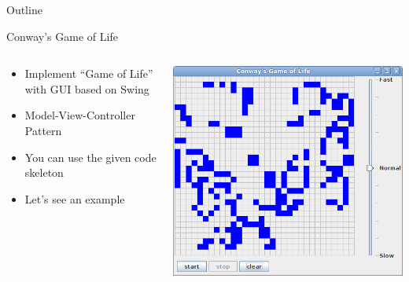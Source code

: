 \begin{frame}{Outline}
  \tableofcontents[current]
\end{frame}

\begin{frame}{Conway's Game of Life}
  \begin{columns}[c]
    \begin{column}{0.45\textwidth}
      \begin{itemize}
      \item Implement ``Game of Life'' with GUI based on Swing
      \item Model-View-Controller Pattern
      \item You can use the given code skeleton
      \item Let's see an example
      \end{itemize}
    \end{column}
    \begin{column}{0.55\textwidth}
      \begin{center}
        \includegraphics[width=\textwidth]{figures/gol}
      \end{center}
    \end{column}
  \end{columns}
\end{frame}

